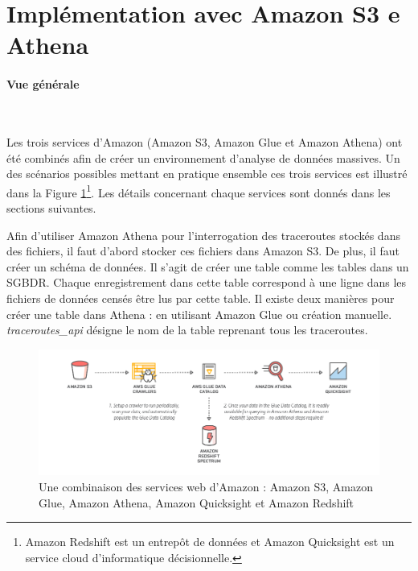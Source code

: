 \section{Implémentation avec Amazon S3 e Athena} \label{implementation-athena}


\paragraph{Vue générale}~

Les trois services d'Amazon (Amazon S3, Amazon Glue  et Amazon Athena) ont été combinés  afin de créer un environnement d'analyse de données massives. 
Un des scénarios possibles mettant en pratique ensemble ces trois services est illustré dans la Figure
\ref{fig:gluecrawler}\footnote{Amazon Redshift  est un entrepôt de données et  Amazon Quicksight  est un service cloud d'informatique décisionnelle.}. Les  détails concernant chaque services sont donnés dans les sections suivantes.

Afin d'utiliser Amazon Athena pour l'interrogation des traceroutes stockés dans des fichiers, il faut d'abord  stocker ces fichiers dans Amazon S3. De plus, il faut créer un  schéma de données. Il s'agit de créer une table comme les tables dans un SGBDR. Chaque enregistrement dans cette table correspond à une ligne dans les fichiers de données censés être lus par cette table. Il existe deux manières pour créer une table dans Athena : en utilisant Amazon Glue ou création manuelle. \textit{traceroutes\_api} désigne le nom de la table reprenant tous les traceroutes.

\begin{figure}[h]
	\centering
	\captionsetup{justification=centering}
	\includegraphics[width=1\linewidth]{illustrations/glue_crawler}
	\caption{Une combinaison des services web d'Amazon : Amazon S3, Amazon Glue, Amazon Athena, Amazon Quicksight  et Amazon Redshift}
	\label{fig:gluecrawler}
\end{figure}


